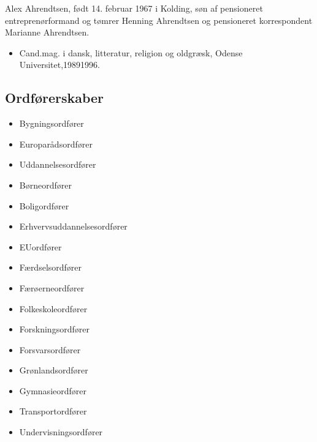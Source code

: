 \documentclass[11pt, a4paper]{awesome-cv}
\begin{document}
\makecvheader[R]
\makelettertitle
\begin{cvletter}
Alex Ahrendtsen, født 14. februar 1967 i Kolding, søn af pensioneret entreprenørformand og tømrer Henning Ahrendtsen og pensioneret korrespondent Marianne Ahrendtsen.

\begin{itemize}
\item Cand.mag. i dansk, litteratur, religion og oldgræsk, Odense Universitet,19891996.
\end{itemize}
\subsection*{Ordførerskaber}
\begin{itemize}
\item Bygningsordfører
\item Europarådsordfører
\item Uddannelsesordfører
\item Børneordfører
\item Boligordfører
\item Erhvervsuddannelsesordfører
\item EUordfører
\item Færdselsordfører
\item Færøerneordfører
\item Folkeskoleordfører
\item Forskningsordfører
\item Forsvarsordfører
\item Grønlandsordfører
\item Gymnasieordfører
\item Transportordfører
\item Undervisningsordfører
\end{itemize}

\end{cvletter}
\end{document}
